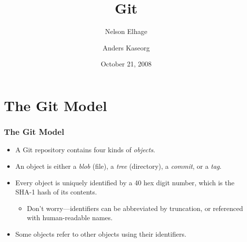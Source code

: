 \documentclass{beamer}
\title{Git}
\author{Nelson Elhage\and Anders Kaseorg}
\institute{Student Information Processing Board}
\date{October 21, 2008}
\begin{document}
\begin{frame}
    \titlepage
\end{frame}

\section{The Git Model}

\begin{frame}
  \frametitle{The Git Model}

  \begin{itemize}
  \item A Git repository contains four kinds of \emph{objects}.
  \item An object is either a \emph{blob} (file), a \emph{tree}
    (directory), a \emph{commit}, or a \emph{tag}.
  \item Every object is uniquely identified by a 40 hex digit number,
    which is the SHA-1 hash of its contents.
    \begin{itemize}
    \item Don't worry---identifiers can be abbreviated by truncation,
      or referenced with human-readable names.
    \end{itemize}
  \item Some objects refer to other objects using their identifiers.
  \end{itemize}
\end{frame}
\end{document}
